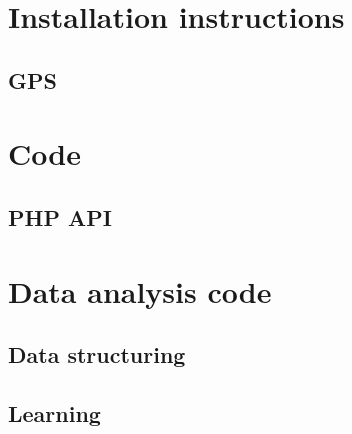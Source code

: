 \documentclass[11pt]{report}
\begin{document}
\clearpage
\newpage
{}


\pagebreak

\appendix

\chapter{Installation instructions}

\section{GPS}

\chapter{Code}

\section{PHP API} \label{php_api}



%
%
%
%
%
%


\chapter{Data analysis code}

\section{Data structuring}

\section{Learning}
\end{document}

